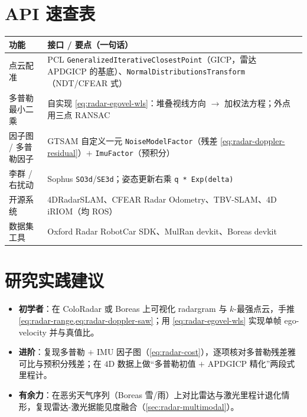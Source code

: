 \section*{API 速查表}
\begin{table}[H]\centering\small
\begin{tabular}{p{} p{}}
\toprule
功能 & 接口 / 要点（一句话） \\
\midrule
点云配准 & PCL \texttt{GeneralizedIterativeClosestPoint}（GICP，雷达 APDGICP 的基底）、\texttt{NormalDistributionsTransform}（NDT/CFEAR 式） \\
多普勒最小二乘 & 自实现 \cref{eq:radar-egovel-wls}：堆叠视线方向 $\to$ 加权法方程；外点用三点 RANSAC \\
因子图 / 多普勒因子 & GTSAM 自定义一元 \texttt{NoiseModelFactor}（残差 \cref{eq:radar-doppler-residual}）$+$ \texttt{ImuFactor}（预积分） \\
李群 / 右扰动 & Sophus \texttt{SO3d}/\allowbreak\texttt{SE3d}；姿态更新右乘 \texttt{q * Exp(delta)} \\
开源系统 & 4DRadarSLAM、CFEAR Radar Odometry、TBV-SLAM、4D iRIOM（均 ROS） \\
数据集工具 & Oxford Radar RobotCar SDK、MulRan devkit、Boreas devkit \\
\bottomrule
\end{tabular}
\end{table}

\section*{研究实践建议}
\begin{itemize}
  \item \textbf{初学者}：在 ColoRadar 或 Boreas 上可视化 radargram 与 $k$-最强点云，手推 \cref{eq:radar-range,eq:radar-doppler-saw}；用 \cref{eq:radar-egovel-wls} 实现单帧 ego-velocity 并与真值比。
  \item \textbf{进阶}：复现多普勒 $+$ IMU 因子图（\cref{eq:radar-cost}），逐项核对多普勒残差雅可比与预积分残差；在 $4$D 数据上做“多普勒初值 $+$ APDGICP 精化”两段式里程计。
  \item \textbf{有余力}：在恶劣天气序列（Boreas 雪/雨）上对比雷达与激光里程计退化情形，复现雷达-激光据能见度融合（\cref{sec:radar-multimodal}）。
\end{itemize}
